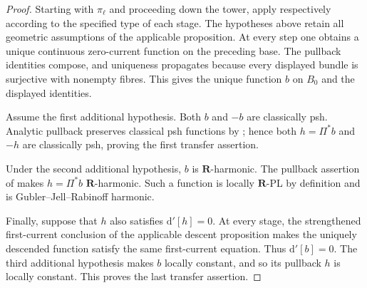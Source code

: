 \begin{proof}
Starting with $\pi_\ell$ and proceeding down the tower, apply respectively
according to the specified type of each stage.  The hypotheses above retain
all geometric assumptions of the applicable proposition.  At every step
one obtains a unique continuous zero-current function on the preceding
base.  The pullback identities compose, and uniqueness propagates because
every displayed bundle is surjective with nonempty fibres.  This gives the
unique function $b$ on $B_0$ and the displayed identities.

Assume the first additional hypothesis.  Both $b$ and $-b$ are classically
psh.  Analytic pullback preserves classical psh functions by
\cite[Proposition~4.2(6)]{GR25Classical}; hence both $h=\Pi^*b$ and $-h$
are classically psh, proving the first transfer assertion.

Under the second additional hypothesis, $b$ is $\mathbf R$-harmonic.
The pullback assertion of  makes
$h=\Pi^*b$ $\mathbf R$-harmonic.  Such a function is locally
$\mathbf R$-PL by definition and is Gubler--Jell--Rabinoff harmonic.

Finally, suppose that $h$ also satisfies $\mathrm d'[h]=0$.  At every
stage, the strengthened first-current conclusion of the applicable descent
proposition makes the uniquely descended function satisfy the same
first-current equation.  Thus $\mathrm d'[b]=0$.  The third additional
hypothesis makes $b$ locally constant, and so its pullback $h$ is locally
constant.  This proves the last transfer assertion.
\end{proof}
